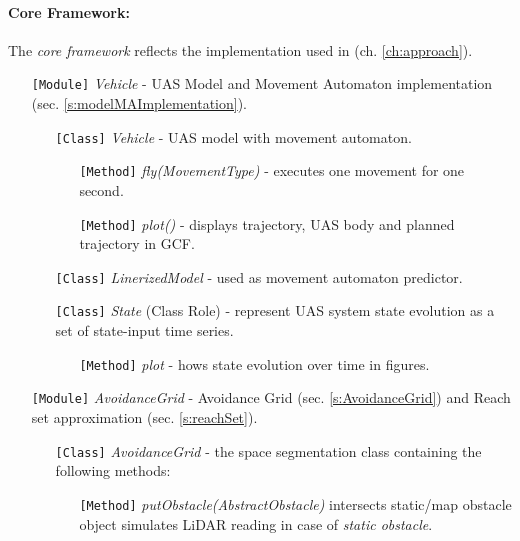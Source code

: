 \paragraph{Core Framework:} The \emph{core framework} reflects the implementation used in (ch. \ref{ch:approach}).
\begin{itemize}
    \item[\texttt{[Module]}] \emph{Vehicle} - UAS Model and Movement Automaton implementation (sec. \ref{s:modelMAImplementation}).
    \begin{itemize}
        \item[\texttt{[Class]}] \emph{Vehicle} - UAS model with movement automaton.
        \begin{itemize}
            \item[\texttt{[Method]}] \emph{fly(MovementType)} - executes one movement for one second.
            \item[\texttt{[Method]}] \emph{plot()} - displays trajectory, UAS body and planned trajectory in GCF.
        \end{itemize}
        
        \item[\texttt{[Class]}] \emph{LinerizedModel} - used as movement automaton predictor. 
        
        \item[\texttt{[Class]}] \emph{State} (Class Role) - represent UAS system state evolution as a set of state-input time series.        
        \begin{itemize}
            \item[\texttt{[Method]}] \emph{plot} - hows state evolution over time in figures.
        \end{itemize}
    \end{itemize}
    
\newpage    
    \item[\texttt{[Module]}] \emph{AvoidanceGrid} - Avoidance Grid (sec. \ref{s:AvoidanceGrid}) and Reach set approximation (sec. \ref{s:reachSet}).
    
     \begin{itemize}
        \item[\texttt{[Class]}] \emph{AvoidanceGrid} - the space segmentation class containing the following methods:
        \begin{itemize}
            \item[\texttt{[Method]}] \emph{putObstacle(AbstractObstacle)} intersects static/map obstacle object simulates LiDAR reading in case of \emph{static obstacle}.
            

\end{itemize}
\end{itemize}
\end{itemize}
